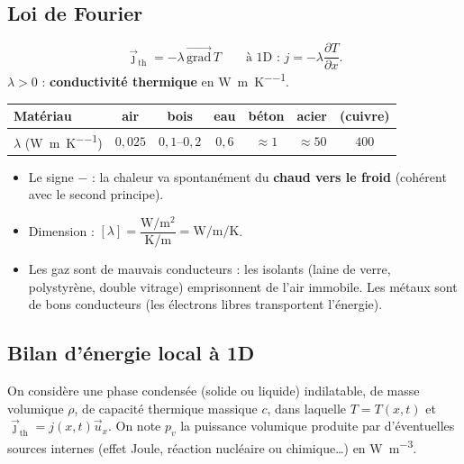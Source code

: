 \documentclass[11pt,a4paper]{article}
\newcommand{\vect}[1]{\overrightarrow{#1}}
\newcommand{\jth}{\vec{\jmath}_{\mathrm{th}}}
\newcommand{\grad}{\vect{\mathrm{grad}}\,}
\newcommand{\ux}{\vec{u}_x}
\newcommand{\pd}[2]{\dfrac{\partial #1}{\partial #2}}
\begin{document}
\subsection{Loi de Fourier}

\begin{formule}[title={Loi de Fourier}]
\[ \boxed{\jth=-\lambda\,\grad T}\qquad\text{à 1D : }j=-\lambda\pd{T}{x}. \]
$\lambda>0$ : \textbf{conductivité thermique} en \si{\watt\per\metre\per\kelvin}.
\begin{center}
\begin{tabular}{lcccccc}
\toprule
Matériau & air & bois & eau & béton & acier & (cuivre) \\
\midrule
$\lambda$ (\si{\watt\per\metre\per\kelvin}) & $0{,}025$ & $0{,}1$--$0{,}2$ & $0{,}6$ & $\approx 1$ & $\approx 50$ & $400$ \\
\bottomrule
\end{tabular}
\end{center}
\end{formule}

\begin{itemize}[leftmargin=1.5em]
  \item Le signe $-$ : la chaleur va spontanément du \textbf{chaud vers le froid} (cohérent
        avec le second principe).
  \item Dimension : $[\lambda]=\dfrac{\si{\watt\per\square\metre}}{\si{\kelvin\per\metre}}
        =\si{\watt\per\metre\per\kelvin}$.
  \item Les gaz sont de mauvais conducteurs : les isolants (laine de verre, polystyrène,
        double vitrage) emprisonnent de l'air immobile. Les métaux sont de bons conducteurs
        (les électrons libres transportent l'énergie).
\end{itemize}

\subsection{Bilan d'énergie local à 1D}

On considère une phase condensée (solide ou liquide) indilatable, de masse volumique $\rho$,
de capacité thermique massique $c$, dans laquelle $T=T(x,t)$ et $\jth=j(x,t)\ux$. On note
$p_v$ la puissance volumique produite par d'éventuelles sources internes (effet Joule,
réaction nucléaire ou chimique\dots) en \si{\watt\per\cubic\metre}.
\end{document}
